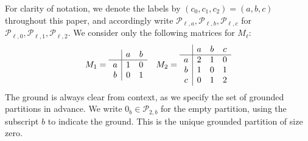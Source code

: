 \documentclass[11pt]{article}
\theoremstyle{definition}
\theoremstyle{remark}
\theoremstyle{definition}
\numberwithin{equation}{section}
\begin{document}
For clarity of notation, we denote the labels by
\( (c_0, c_1, c_2) = (a,b,c) \) throughout this paper, and accordingly
write
\( \mathcal{P}_{\ell,a}, \mathcal{P}_{\ell,b}, \mathcal{P}_{\ell,c} \)
for
\( \mathcal{P}_{\ell,0}, \mathcal{P}_{\ell,1}, \mathcal{P}_{\ell,2}
\). We consider only the following matrices for $M_\ell$:
\begin{align}
\label{matrix:M}
M_1=\begin{array}{c|cc}
    & \textcolor{black}{a} & \textcolor{black}{b} \\ \hline
\textcolor{black}{a} & 1 & 0 \\
\textcolor{black}{b} & 0 & 1 \\
\end{array}
&&
M_2=\begin{array}{c|ccc}
    & \textcolor{black}{a} & \textcolor{black}{b} & \textcolor{black}{c} \\ \hline
\textcolor{black}{a} & 2 & 1 & 0 \\
\textcolor{black}{b} & 1 & 0 & 1 \\
\textcolor{black}{c} & 0 & 1 & 2 \\
\end{array}
\end{align}
The ground is always clear from context, as we specify the set of grounded partitions in advance. We write \( 0_b \in \mathcal{P}_{2,b} \) for the empty partition, using the subscript \( b \) to indicate the ground. This is the unique grounded partition of size zero.
\end{document}
